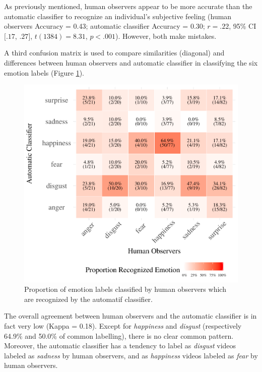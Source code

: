 \documentclass[man]{apa6}
\begin{document}
As previously mentioned, human observers appear to be more accurate than the automatic classifier to recognize an individual's subjective feeling (human observers Accuracy = 0.43; automatic classifier Accuracy = 0.30; \(r = .22\), 95\% CI \([.17\), \(.27]\), \(t(1384) = 8.31\), \(p < .001\)). However, both make mistakes.

A third confusion matrix is used to compare similarities (diagonal) and differences between human observers and automatic classifier in classifying the six emotion labels (Figure \ref{fig:confusionMatrix-hr-ar}).

\begin{figure}[!h]
\includegraphics[width=\textwidth]{manuscript_apa_files/figure-latex/confusionMatrix-hr-ar-1} \caption{Proportion of emotion labels classified by human observers which are recognized by the automatif classifier.}\label{fig:confusionMatrix-hr-ar}
\end{figure}

The overall agreement between human observers and the automatic classifier is in fact very low (Kappa = 0.18). Except for \emph{happiness} and \emph{disgust} (respectively 64.9\% and 50.0\% of common labelling), there is no clear common pattern. Moreover, the automatic classifier has a tendency to label as \emph{disgust} videos labeled as \emph{sadness} by human observers, and as \emph{happiness} videos labeled as \emph{fear} by human observers.
\end{document}
